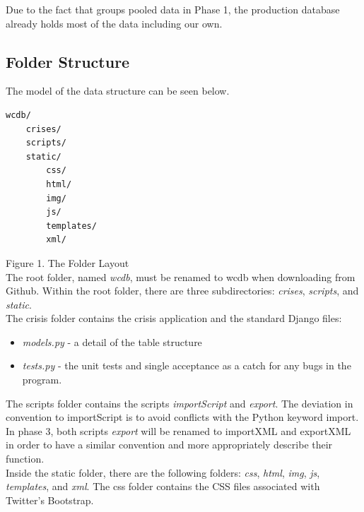 \documentclass[12pt]{report}
\begin{document}
Due to the fact that groups pooled data in Phase 1, the production database already holds most of the data including our own.\\

\subsection*{Folder Structure}
\hfill


The model of the data structure can be seen below.\\

\begin{lstlisting}
wcdb/
    crises/
    scripts/
    static/
        css/
        html/
        img/
        js/
        templates/
        xml/
\end{lstlisting}
\footnotesize Figure 1. The Folder Layout \normalsize
\hfill\\


The root folder, named \emph{wcdb}, must be renamed to wcdb when downloading from Github.
Within the root folder, there are three subdirectories: \emph{crises}, \emph{scripts}, and \emph{static}.\\


The crisis folder contains the crisis application and the standard Django files:
\begin{itemize}
\item \emph{models.py} - a detail of the table structure
\item \emph{tests.py} - the unit tests and single acceptance as a catch for any bugs in the program.
\end{itemize}


The scripts folder contains the scripts \emph{importScript} and \emph{export}.
The deviation in convention to importScript is to avoid conflicts with the Python keyword import.
In phase 3, both scripts \emph{export} will be renamed to importXML and exportXML in order to have a similar
convention and more appropriately describe their function.\\


Inside the static folder, there are the following folders: \emph{css}, \emph{html}, \emph{img}, \emph{js}, \emph{templates}, and \emph{xml}.
The css folder contains the CSS files associated with Twitter's Bootstrap.\\
\end{document}
